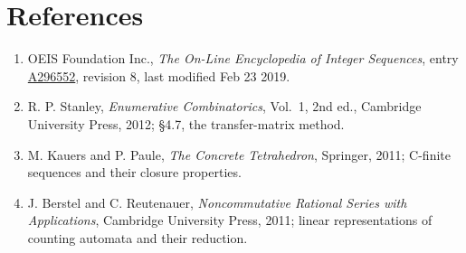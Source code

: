 \documentclass[11pt]{article}
\theoremstyle{definition}
\begin{document}
\section{References}

\begin{enumerate}

\item OEIS Foundation Inc., \emph{The On-Line Encyclopedia of Integer Sequences}, entry \href{https://oeis.org/A296552}{A296552}, revision 8, last modified Feb 23 2019.

\item R. P. Stanley, \emph{Enumerative Combinatorics}, Vol.~1, 2nd ed., Cambridge University Press, 2012; \S4.7, the transfer-matrix method.

\item M. Kauers and P. Paule, \emph{The Concrete Tetrahedron}, Springer, 2011; C-finite sequences and their closure properties.

\item J. Berstel and C. Reutenauer, \emph{Noncommutative Rational Series with Applications}, Cambridge University Press, 2011; linear representations of counting automata and their reduction.

\end{enumerate}
\end{document}
